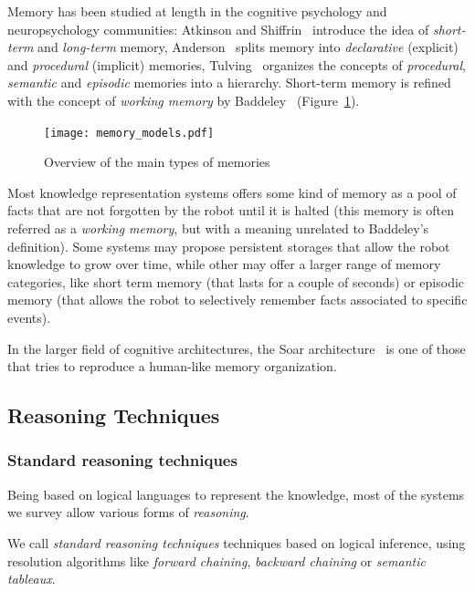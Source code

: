 \documentclass[a4paper, twocolumn]{article}
\begin{document}
Memory has been studied at length in the cognitive psychology and
neuropsychology communities: Atkinson and Shiffrin~\cite{Atkinson1968}
introduce the idea of \emph{short-term} and \emph{long-term} memory,
Anderson~\cite{Anderson1976} splits memory into \emph{declarative} (explicit)
and \emph{procedural} (implicit) memories, Tulving~\cite{Tulving1985} organizes
the concepts of \emph{procedural}, \emph{semantic} and \emph{episodic} memories
into a hierarchy. Short-term memory is refined with the concept of
\emph{working memory} by Baddeley~\cite{Baddeley2010}
(Figure~\ref{fig|memory_models}).

\begin{figure}
    \centering
    \texttt{[image: memory\_models.pdf]}
    \caption{Overview of the main types of memories}
    \label{fig|memory_models}
\end{figure}

Most knowledge representation systems offers some kind of memory as a pool of
facts that are not forgotten by the robot until it is halted (this memory is
often referred as a \emph{working memory}, but with a meaning unrelated to
Baddeley's definition). Some systems may propose persistent storages that allow
the robot knowledge to grow over time, while other may offer a larger range of
memory categories, like short term memory (that lasts for a couple of seconds)
or episodic memory (that allows the robot to selectively remember facts
associated to specific events).

In the larger field of cognitive architectures, the {\sc Soar}
architecture~\cite{Lehman2006} is one of those that tries to reproduce a
human-like memory organization.

\subsection{Reasoning Techniques}
\label{sect|reasoning}

\subsubsection{Standard reasoning techniques}

Being based on logical languages to represent the knowledge, most of the
systems we survey allow various forms of \emph{reasoning}.

We call \emph{standard reasoning techniques} techniques based on logical
inference, using resolution algorithms like \emph{forward chaining},
\emph{backward chaining} or \emph{semantic tableaux}.
\end{document}
